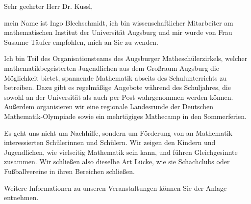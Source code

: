 \documentclass{zirkelbrief}
\begin{document}
\renewcommand{\anschrift}{%
      Dr. Rolf Kussl (Ref. V.3) \\
      Bayerisches Staatsministerium für \\
Bildung und Kultus, Wissenschaft und Kunst \\
      80327 München}
\renewcommand{\datum}{\today}
\renewcommand{\betreff}{Matheschülerzirkel der Universität Augsburg}
\renewcommand{\absender}{%
      \textbf{Ingo Blechschmidt} \\
      \ \\
      Matheschülerzirkel \\
      Institut für Mathematik \\
      Universitätsstr. 14 \\
      86159 Augsburg \\
      \ \\
      Telefon \> +49 (0) 821 598 -- 5601 \\
      Telefax \> +49 (0) 821 598 -- 2090 \\
      \textsf{blechschmidt@math.uni-augsburg.de} \\}

\makeletterhead

Sehr geehrter Herr Dr. Kussl,

mein Name ist Ingo Blechschmidt, ich bin wissenschaftlicher Mitarbeiter
am mathematischen Institut der Universität Augsburg und mir wurde von Frau Susanne Täufer empfohlen, mich an Sie zu wenden.

Ich bin Teil des Organisationsteams des Augsburger Matheschülerzirkels, welcher mathematikbegeisterten Jugendlichen aus dem Großraum Augsburg die Möglichkeit bietet, spannende Mathematik abseits des Schulunterrichts zu betreiben. Dazu gibt es regelmäßige Angebote während des Schuljahres, die sowohl an der Universität als auch per Post wahrgenommen werden können. Außerdem organisieren wir eine regionale Landesrunde der Deutschen Mathematik-Olympiade sowie ein mehrtägiges Mathecamp in den Sommerferien.

Es geht uns nicht um Nachhilfe, sondern um Förderung von an Mathematik
interessierten Schülerinnen und Schülern. Wir zeigen den Kindern und
Jugendlichen, wie vielseitig Mathematik sein kann, und führen
Gleichgesinnte zusammen. Wir schließen also dieselbe Art Lücke, wie sie
Schachclubs oder Fußballvereine in ihren Bereichen schließen.

Weitere Informationen zu unseren Veranstaltungen können Sie der Anlage entnehmen.
\end{document}
